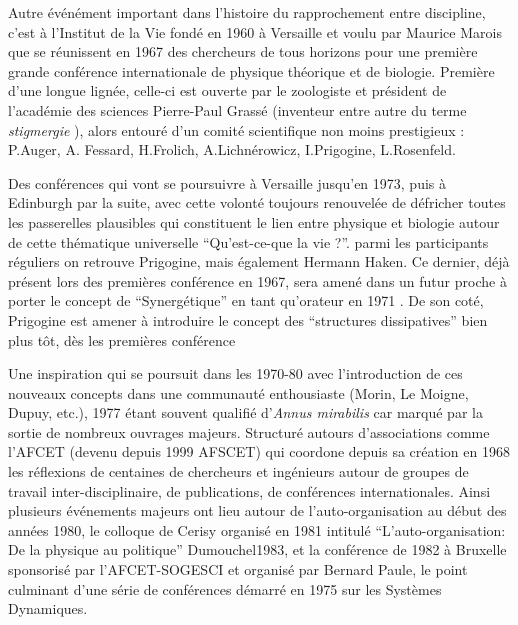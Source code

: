Autre événément important dans l'histoire du rapprochement entre discipline, c'est à l'Institut de la Vie fondé en 1960 à Versaille et voulu par Maurice Marois que se réunissent en 1967 des chercheurs de tous horizons pour une première grande conférence internationale de physique théorique et de biologie. Première d'une longue lignée, celle-ci est ouverte par le zoologiste et président de l'académie des sciences Pierre-Paul Grassé (inventeur entre autre du terme \textit{stigmergie} \autocite{Theraulaz1999}), alors entouré d'un comité scientifique non moins prestigieux : P.Auger, A. Fessard, H.Frolich, A.Lichnérowicz, I.Prigogine, L.Rosenfeld. \autocites{Marois1969,Marois1971}

Des conférences qui vont se poursuivre à Versaille jusqu'en 1973, puis à Edinburgh par la suite, avec cette volonté toujours renouvelée de défricher toutes les passerelles plausibles qui constituent le lien entre physique et biologie autour de cette thématique universelle \enquote{Qu'est-ce-que la vie ?}. parmi les participants réguliers on retrouve Prigogine, mais également Hermann Haken. Ce dernier, déjà présent lors des premières conférence en 1967, sera amené dans un futur proche à porter le concept de \enquote{Synergétique} en tant qu'orateur en 1971 \autocite{Kroger2012, Kroger2015}. De son coté,  Prigogine est amener à introduire le concept des \enquote{structures dissipatives} bien plus tôt, dès les premières conférence \autocite[60]{Stengers1985}

Une inspiration qui se poursuit dans les 1970-80 avec l'introduction de ces nouveaux concepts dans une communauté enthousiaste (Morin, Le Moigne, Dupuy, etc.), 1977 étant souvent qualifié d'\textit{Annus mirabilis} car marqué par la sortie de nombreux ouvrages majeurs. Structuré autours d'associations comme l'AFCET (devenu depuis 1999 AFSCET) qui coordone depuis sa création en 1968 \autocite{Hoffsaes1990} les réflexions de centaines de chercheurs et ingénieurs autour de groupes de travail inter-disciplinaire, de publications, de conférences internationales. Ainsi plusieurs événements majeurs ont lieu autour de l'auto-organisation au début des années 1980, le colloque de Cerisy organisé en 1981 intitulé \enquote{L'auto-organisation: De la physique au politique} \autocite*[postnote]{key}{Dumouchel1983}, et la conférence de 1982 à Bruxelle sponsorisé par l'AFCET-SOGESCI et organisé par Bernard Paule, le point culminant d'une série de conférences démarré en 1975 sur les Systèmes Dynamiques.



